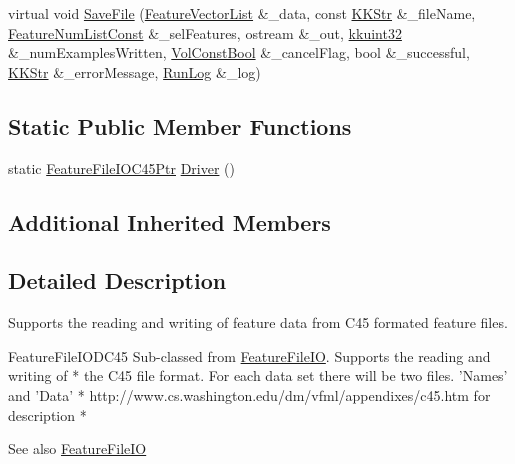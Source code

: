 \begin{DoxyCompactItemize}
\item 
virtual void \hyperlink{class_k_k_m_l_l_1_1_feature_file_i_o_c45_ab2fdc4e67aad229afa7aed75999eeb5b}{Save\+File} (\hyperlink{class_k_k_m_l_l_1_1_feature_vector_list}{Feature\+Vector\+List} \&\+\_\+data, const \hyperlink{class_k_k_b_1_1_k_k_str}{K\+K\+Str} \&\+\_\+file\+Name, \hyperlink{namespace_k_k_m_l_l_ad276a9ed309552a63300bce930bdfebd}{Feature\+Num\+List\+Const} \&\+\_\+sel\+Features, ostream \&\+\_\+out, \hyperlink{namespace_k_k_b_af8d832f05c54994a1cce25bd5743e19a}{kkuint32} \&\+\_\+num\+Examples\+Written, \hyperlink{namespace_k_k_b_a7d390f568e2831fb76b86b56c87bf92f}{Vol\+Const\+Bool} \&\+\_\+cancel\+Flag, bool \&\+\_\+successful, \hyperlink{class_k_k_b_1_1_k_k_str}{K\+K\+Str} \&\+\_\+error\+Message, \hyperlink{class_k_k_b_1_1_run_log}{Run\+Log} \&\+\_\+log)
\end{DoxyCompactItemize}
\subsection*{Static Public Member Functions}
\begin{DoxyCompactItemize}
\item 
static \hyperlink{class_k_k_m_l_l_1_1_feature_file_i_o_c45_ae0cc1ea15fc10f1a030fcbbf10a08af8}{Feature\+File\+I\+O\+C45\+Ptr} \hyperlink{class_k_k_m_l_l_1_1_feature_file_i_o_c45_a68cdc1cc37b82e88460fa86401f01b51}{Driver} ()
\end{DoxyCompactItemize}
\subsection*{Additional Inherited Members}


\subsection{Detailed Description}
Supports the reading and writing of feature data from C45 formated feature files. 


\begin{DoxyCode}
FeatureFileIODC45   Sub-classed from \hyperlink{class_k_k_m_l_l_1_1_feature_file_i_o_a820170380cfca6a036a29d2c51b8441a}{FeatureFileIO}.  Supports the reading and writing of    *
the C45 file format.  For each data \textcolor{keyword}{set} there will be two files.  \textcolor{stringliteral}{'Names'}  and  \textcolor{stringliteral}{'Data'}      *
http:\textcolor{comment}{//www.cs.washington.edu/dm/vfml/appendixes/c45.htm  for description                    *}
\end{DoxyCode}
 \begin{DoxySeeAlso}{See also}
\hyperlink{class_k_k_m_l_l_1_1_feature_file_i_o}{Feature\+File\+IO} 
\end{DoxySeeAlso}


